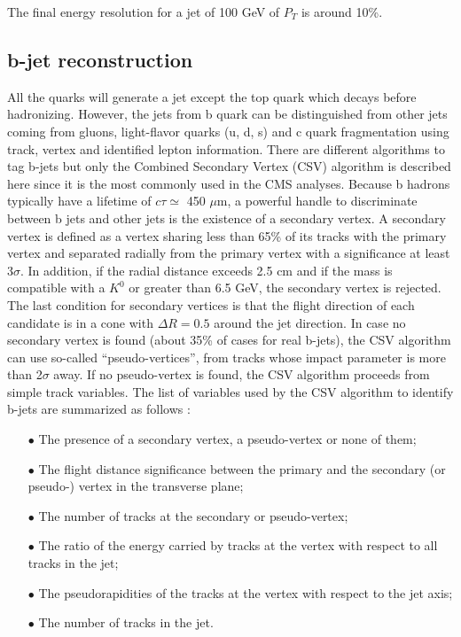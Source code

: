 The final energy resolution for a jet of 100 GeV of $P_{T}$ is around 10\%.

\subsection{b-jet reconstruction}\label{subsec:b-jet}

All the quarks will generate a jet except the top quark which decays before hadronizing. However, the jets from b quark can be distinguished from other jets coming from gluons, light-flavor quarks (u, d, s) and c quark fragmentation using track, vertex and identified lepton information. There are different algorithms to tag b-jets but only the Combined Secondary Vertex (CSV) algorithm is described here since it is the most commonly used in the CMS analyses. Because b hadrons typically have a lifetime of $c\tau \simeq$ 450 $\mu$m, a powerful handle to discriminate between b jets and other jets is the existence of a secondary vertex. A secondary vertex is defined as a vertex sharing less than 65\% of its tracks with the primary vertex and separated radially from the primary vertex with a significance at least 3$\sigma$. In addition, if the radial distance exceeds 2.5 cm and if the mass is compatible with a $K^0$ or greater than 6.5 GeV, the secondary vertex is rejected. The last condition for secondary vertices is that the flight direction of each candidate is in a cone with $\Delta R=0.5$ around the jet direction.
In case no secondary vertex is found (about 35\% of cases for real b-jets), the CSV algorithm can use so-called ``pseudo-vertices'', from tracks whose impact parameter is more than 2$\sigma$ away. If no pseudo-vertex is found, the CSV algorithm proceeds from simple track variables. The list of variables used by the CSV algorithm to identify b-jets are summarized as follows \cite{b_cds}:
\begin{itemize}
\item[$\bullet$] The presence of a secondary vertex, a pseudo-vertex or none of them;
\item[$\bullet$] The flight distance significance between the primary and the secondary (or pseudo-) vertex in the transverse plane;
\item[$\bullet$] The number of tracks at the secondary or pseudo-vertex;
\item[$\bullet$] The ratio of the energy carried by tracks at the vertex with respect to all tracks in the jet;
\item[$\bullet$] The pseudorapidities of the tracks at the vertex with respect to the jet axis;
\item[$\bullet$] The number of tracks in the jet.
\end{itemize}

